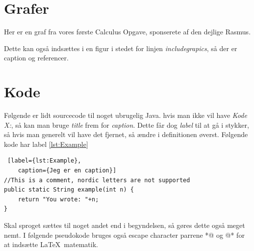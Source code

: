 \documentclass[a4, danish]{article}
\begin{document}
\newpage
\section{Grafer}
Her er en graf fra vores første Calculus Opgave, sponserete af den dejlige Rasmus. \cite{rasmus}

\begin{center}
\end{center}

\noindent Dette kan også indsættes i en figur i stedet for linjen \emph{includegrapics}, så der er caption og referencer.

\section{Kode}
Følgende er lidt sourcecode til noget ubrugelig Java. hvis man ikke vil have \emph{Kode X:}, så kan man bruge \emph{title} frem for \emph{caption}. Dette får dog \emph{label} til at gå i stykker, så hvis man generelt vil have det fjernet, så ændre i definitionen øverst. Følgende kode har label \ref{lst:Example}

\begin{lstlisting} [label={lst:Example},
	caption={Jeg er en caption}]
//This is a comment, nordic letters are not supported
public static String example(int n) {
	return "You wrote: "+n;
}
\end{lstlisting}

Skal sproget sættes til noget andet end i begyndelsen, så gøres dette også meget nemt. I følgende pseudokode bruges også escape character parrene *@ og @* for at indsætte \LaTeX\ matematik.
\end{document}
